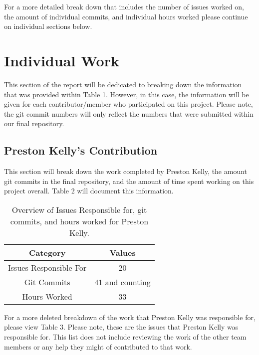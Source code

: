 \documentclass{article}
\begin{document}
	For a more detailed break down that includes the number of issues worked on, the amount of individual commits, and individual hours worked please continue on individual sections below.
	
	\section{Individual Work}
	
	This section of the report will be dedicated to breaking down the information that was provided within Table 1. However, in this case, the information will be given for each contributor/member who participated on this project. Please note, the git commit numbers will only reflect the numbers that were submitted within our final repository.
	
	\subsection{Preston Kelly's Contribution}
	
	This section will break down the work completed by Preston Kelly, the amount git commits in the final repository, and the amount of time spent working on this project overall. Table 2 will document this information. 
	
	\begin{table}[htbp!]
		\centering
		\begin{tabular}{||c c ||} 
			\hline
			Category & Values \\ [0.5ex] 
			\hline\hline
			Issues Responsible For & 20  \\ 
			Git Commits & 41 and counting \\
			Hours Worked & 33 \\
			\hline
		\end{tabular}
		\caption{Overview of Issues Responsible for, git commits, and hours worked for Preston Kelly.}
		\label{table:2}
	\end{table}
	
	For a more deleted breakdown of the work that Preston Kelly was responsible for, please view Table 3. Please note, these are the issues that Preston Kelly was responsible for. This list does not include reviewing the work of the other team members or any help they might of contributed to that work.
	
\end{document}
